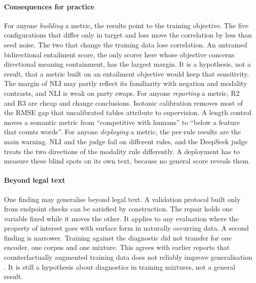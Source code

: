 \documentclass{BVP_JCLLT}
\begin{document}
{\paragraph{Consequences for practice}
For anyone \emph{building} a metric, the results point to the training
objective. The five configurations that differ only in target and loss move the
correlation by less than seed noise. The two that change the training data lose
correlation. An untrained bidirectional entailment score, the only scorer here
whose objective concerns directional meaning containment, has the largest
margin. It is a hypothesis, not a result, that a metric built on an entailment
objective would keep that sensitivity. The margin of NLI may partly reflect its
familiarity with negation and modality contrasts, and NLI is weak on party
swaps. For anyone \emph{reporting} a metric, R2 and R3 are cheap and change
conclusions. Isotonic calibration removes most of the RMSE gap that uncalibrated
tables attribute to supervision. A length control moves a semantic metric from
``competitive with humans'' to ``below a feature that counts words''. For
anyone \emph{deploying} a metric, the per-rule results are the main warning. NLI
and the judge fail on different rules, and the DeepSeek judge treats the two
directions of the modality rule differently. A deployment has to measure these blind spots
on its own text, because no general score reveals them.

\paragraph{Beyond legal text}
One finding may generalise beyond legal text. A validation protocol built only
from endpoint checks can be satisfied by construction. The repair holds one
variable fixed while it moves the other. It applies to any evaluation where the
property of interest goes with surface form in naturally occurring data. A
second finding is narrower. Training against the diagnostic did not transfer
for one encoder, one corpus and one mixture. This agrees with earlier reports
that counterfactually augmented training data does not reliably improve
generalisation \cite{kaushik2020counterfactual,huang2020counterfactual}. It is
still a hypothesis about diagnostics in training mixtures, not a general result.

}
\end{document}
